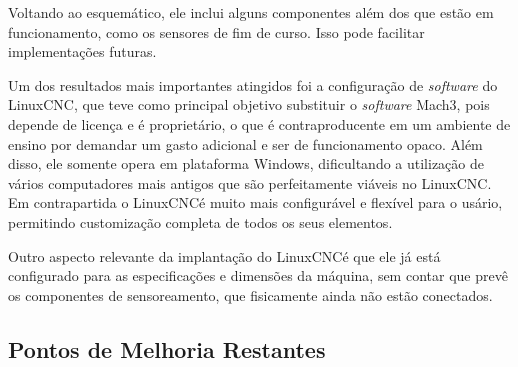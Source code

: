 \documentclass[
	article,			%
	11pt,				%
	oneside,			%
	a4paper,			%
	section=TITLE,		%
	english,			%
	brazil,				%
	sumario=tradicional
	]{abntex2}
\newcommand{\LCNC}{LinuxCNC}
\begin{document}
Voltando ao esquemático, ele inclui alguns componentes além dos que estão em funcionamento, como os sensores de fim de curso. Isso pode facilitar implementações futuras.

Um dos resultados mais importantes atingidos foi a configuração de \textit{software} do \LCNC, que teve como principal objetivo substituir o \textit{software} Mach3, pois depende de licença e é proprietário, o que é contraproducente em um ambiente de ensino por demandar um gasto adicional e ser de funcionamento opaco. Além disso, ele somente opera em plataforma Windows, dificultando a utilização de vários computadores mais antigos que são perfeitamente viáveis no \LCNC. Em contrapartida o \LCNC é muito mais configurável e flexível para o usário, permitindo customização completa de todos os seus elementos.

Outro aspecto relevante da implantação do \LCNC  é que ele já está configurado para as especificações e dimensões da máquina, sem contar que prevê os componentes de sensoreamento, que fisicamente ainda não estão conectados.


\subsection{Pontos de Melhoria Restantes}
\end{document}
